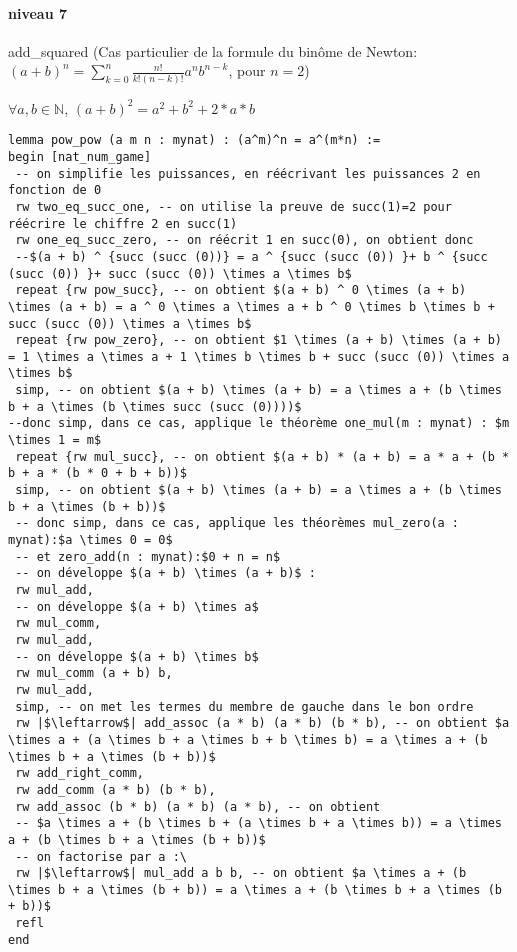 \paragraph{niveau 7} add\_squared (Cas particulier de la formule du binôme de Newton: $(a+b)^n=\sum_{k=0}^{n}{\frac{n!}{k!(n-k)!} a^nb^{n-k}}$, pour $n=2$)
\begin{center} $\forall a, b \in \mathbb{N}$, $(a+b)^2=a^2+b^2+2*a*b $\end{center}
\begin{verbatim}
lemma pow_pow (a m n : mynat) : (a^m)^n = a^(m*n) :=
begin [nat_num_game]
 -- on simplifie les puissances, en réécrivant les puissances 2 en fonction de 0 
 rw two_eq_succ_one, -- on utilise la preuve de succ(1)=2 pour réécrire le chiffre 2 en succ(1)
 rw one_eq_succ_zero, -- on réécrit 1 en succ(0), on obtient donc 
 --$(a + b) ^ {succ (succ (0))} = a ^ {succ (succ (0)) }+ b ^ {succ (succ (0)) }+ succ (succ (0)) \times a \times b$
 repeat {rw pow_succ}, -- on obtient $(a + b) ^ 0 \times (a + b) \times (a + b) = a ^ 0 \times a \times a + b ^ 0 \times b \times b + succ (succ (0)) \times a \times b$ 
 repeat {rw pow_zero}, -- on obtient $1 \times (a + b) \times (a + b) = 1 \times a \times a + 1 \times b \times b + succ (succ (0)) \times a \times b$
 simp, -- on obtient $(a + b) \times (a + b) = a \times a + (b \times b + a \times (b \times succ (succ (0))))$
--donc simp, dans ce cas, applique le théorème one_mul(m : mynat) : $m \times 1 = m$
 repeat {rw mul_succ}, -- on obtient $(a + b) * (a + b) = a * a + (b * b + a * (b * 0 + b + b))$
 simp, -- on obtient $(a + b) \times (a + b) = a \times a + (b \times b + a \times (b + b))$
 -- donc simp, dans ce cas, applique les théorèmes mul_zero(a : mynat):$a \times 0 = 0$ 
 -- et zero_add(n : mynat):$0 + n = n$
 -- on développe $(a + b) \times (a + b)$ :
 rw mul_add,
 -- on développe $(a + b) \times a$ 
 rw mul_comm,
 rw mul_add,
 -- on développe $(a + b) \times b$ 
 rw mul_comm (a + b) b,
 rw mul_add,
 simp, -- on met les termes du membre de gauche dans le bon ordre 
 rw |$\leftarrow$| add_assoc (a * b) (a * b) (b * b), -- on obtient $a \times a + (a \times b + a \times b + b \times b) = a \times a + (b \times b + a \times (b + b))$
 rw add_right_comm,
 rw add_comm (a * b) (b * b),
 rw add_assoc (b * b) (a * b) (a * b), -- on obtient 
 -- $a \times a + (b \times b + (a \times b + a \times b)) = a \times a + (b \times b + a \times (b + b))$
 -- on factorise par a :\
 rw |$\leftarrow$| mul_add a b b, -- on obtient $a \times a + (b \times b + a \times (b + b)) = a \times a + (b \times b + a \times (b + b))$
 refl
end
\end{verbatim}
